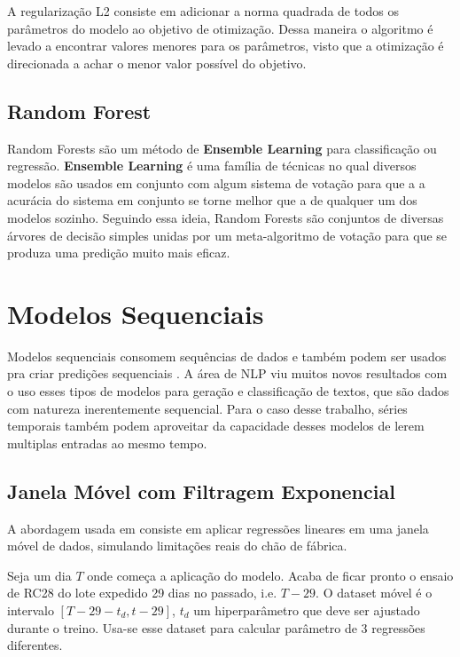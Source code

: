 A regularização L2 consiste em adicionar a norma quadrada de todos os parâmetros
do modelo ao objetivo de otimização. Dessa maneira o algoritmo é levado a
encontrar valores menores para os parâmetros, visto que a otimização é
direcionada a achar o menor valor possível do objetivo.

\subsection{Random Forest}

Random Forests são um método de \textbf{Ensemble Learning} para classificação ou regressão. \textbf{Ensemble Learning} é uma família de técnicas no qual diversos modelos  são usados em conjunto com algum sistema de votação para que a a acurácia do sistema em conjunto se torne melhor que a de qualquer um dos modelos sozinho. Seguindo essa ideia, Random Forests são conjuntos de diversas árvores de decisão simples unidas por um meta-algoritmo de votação para que se produza uma predição muito mais eficaz.


\section{Modelos Sequenciais}

Modelos sequenciais consomem sequências de dados e também podem ser usados pra
criar predições sequenciais \citep{dlbook}. A área de NLP viu muitos novos
resultados com o uso esses tipos de modelos para geração e classificação de textos, que são dados com
natureza inerentemente sequencial. Para o caso desse trabalho, séries temporais também podem
aproveitar da capacidade desses modelos de lerem multiplas entradas ao mesmo tempo.



\subsection{Janela Móvel com Filtragem Exponencial}

A abordagem usada em \cite{grecialin} consiste em aplicar regressões lineares em
uma janela móvel de dados, simulando limitações reais do chão de fábrica.

Seja um dia $T$ onde começa a aplicação do modelo. Acaba de ficar pronto o ensaio
de RC28 do lote expedido 29 dias no passado, i.e. $T-29$.  O dataset móvel é o
intervalo $[T-29-t_d,t-29]$, $t_d$ um hiperparâmetro que deve ser ajustado
durante o treino. Usa-se esse dataset para calcular parâmetro de 3 regressões
diferentes.


